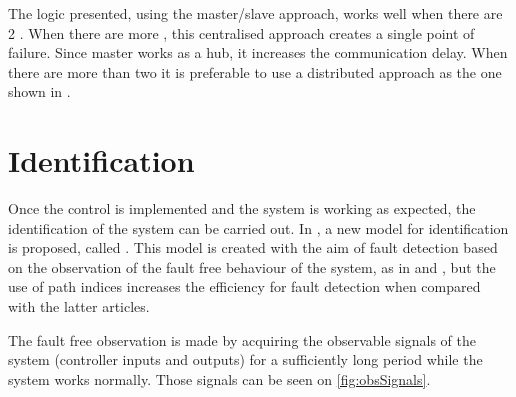 


The logic presented, using the master\slash slave approach, works well when
there are 2 \PLCs. When there are more \PLCs, this centralised approach
creates a single point of failure. Since master \PLC{} works as a hub, it
increases the communication delay. When there are more than two \PLCs{} it is
preferable to use a distributed approach as the one shown in
\cite{antunesfloriano2019sincronizacao}.

\section{Identification}
\label{sec:identification}

Once the control is implemented and the system is working as expected, the
identification of the system can be carried out.
In \cite{moreira2018enhanced}, a new model for \DES{} identification is proposed, called
\DAOCT. This model is created with the aim of fault detection based
on the observation of the fault free behaviour of the system, as in \cite{roth2009fdi} and \cite{klein2005fault}, but the use of path indices increases the
efficiency for fault detection when compared with the latter articles.

The fault free observation is made by acquiring the observable signals
of the system (controller inputs and outputs) for a sufficiently long
period while the system works normally. Those signals can be seen on \autoref{fig:obsSignals}.

